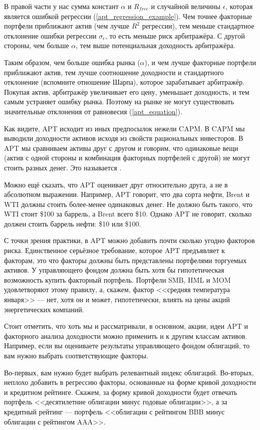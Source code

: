 В правой части у нас сумма констант $\alpha$ и $R_{free}$ и случайной величины $\epsilon$, которая является ошибкой регрессии (\ref{apt_regression_example}). Чем точнее факторные портфели приближают актив (чем лучше $R^2$ регрессии), тем меньше стандартное отклонение ошибки регрессии $\sigma_{\epsilon}$, то есть меньше риск арбитражёра. С другой стороны, чем больше $\alpha$, тем выше потенциальная доходность арбитражёра.

Таким образом, чем больше ошибка рынка ($\alpha$), и чем лучше факторные портфели приближают актив, тем лучше соотношение доходности и стандартного отклонение (вспомните отношение Шарпа), которое зарабатывает арбитражёр. Покупая актив, арбитражёр увеличивает его цену, уменьшает доходность, и тем самым устраняет ошибку рынка. Поэтому на рынке не могут существовать значительные отклонения от равновесия (\ref{apt_equation}).

Как видите, APT исходит из иных предпосылок нежели CAPM. В CAPM мы выводили доходности активов исходя из свойств рациональных инвесторов. В APT мы сравниваем активы друг с другом и говорим, что одинаковые вещи (актив с одной стороны и комбинация факторных портфелей с другой) не могут стоить разных денег. Это называется . 

Можно ещё сказать, что APT оценивает друг относительно друга, а не в абсолютном выражении. Например, APT говорит, что два сорта нефти, Brent и WTI должны стоить более-менее одинаковых денег. Не должно быть такого, что WTI стоит \$100 за баррель, а Brent всего \$10. Однако APT не говорит, сколько должен стоить баррель нефти: \$10 или \$100.

С точки зрения практики, в APT можно добавить почти сколько угодно факторов риска. Единственное серьёзное требование, которое APT предъявляет к факторам, это что факторы должны быть представлены портфелями торгуемых активов. У управляющего фондом должна быть хотя бы гипотетическая возможность купить факторный портфель. Портфели SMB, HML и MOM удовлетворяют этому правилу, а, скажем, фактор <<средняя температура января>> --- нет, хотя он и может, гипотетически, влиять на цены акций энергетических компаний.

Стоит отметить, что хоть мы и рассматривали, в основном, акции, идеи APT и факторного анализа доходности можно применить и к другим классам активов. Например, если вы оцениваете результаты управляющего фондом облигаций, то вам нужно выбрать соответствующие факторы.

Во-первых, вам нужно будет выбрать релевантный индекс облигаций. Во-вторых, неплохо добавить в регрессию факторы, основанные на форме кривой доходности и кредитном рейтинге. Скажем, за форму кривой доходности будет отвечать портфель <<десятилетние облигации минус годовые облигации>>, а за кредитный рейтинг --- портфель <<облигации с рейтингом BBB минус облигации с рейтингом AAA>>.

